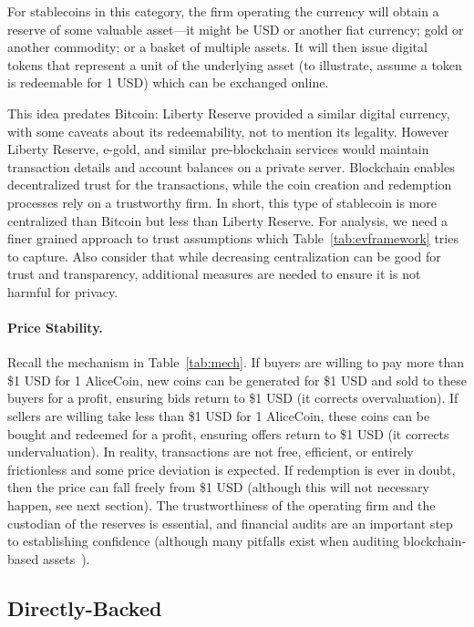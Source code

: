 For stablecoins in this category, the firm operating the currency will obtain a reserve of some valuable asset---it might be USD or another fiat currency; gold or another commodity; or a basket of multiple assets.  It will then issue digital tokens that represent a unit of the underlying asset (to illustrate, assume a token is redeemable for 1 USD) which can be exchanged online.

This idea predates Bitcoin: Liberty Reserve provided a similar digital currency, with some caveats about its redeemability, not to mention its legality. However Liberty Reserve, e-gold, and similar pre-blockchain services would maintain transaction details and account balances on a private server. Blockchain enables decentralized trust for the transactions, while the coin creation and redemption processes rely on a trustworthy firm. In short, this type of stablecoin is more centralized than Bitcoin but less than Liberty Reserve. For analysis, we need a finer grained approach to trust assumptions which Table~\ref{tab:evframework} tries to capture. Also consider that while decreasing centralization can be good for trust and transparency, additional measures are needed to ensure it is not harmful for privacy.

\paragraph{Price Stability.} Recall the mechanism in Table~\ref{tab:mech}. If buyers are willing to pay more than \$1 USD for 1 AliceCoin, new coins can be generated for \$1 USD and sold to these buyers for a profit, ensuring bids return to \$1 USD (it corrects overvaluation). If sellers are willing take less than \$1 USD for 1 AliceCoin, these coins can be bought and redeemed for a profit, ensuring offers return to \$1 USD (it corrects undervaluation). In reality, transactions are not free, efficient, or entirely frictionless and some price deviation is expected. If redemption is ever in doubt, then the price can fall freely from \$1 USD (although this will not necessary happen, see next section). The trustworthiness of the operating firm and the custodian of the reserves is essential, and financial audits are an important step to establishing confidence (although many pitfalls exist when auditing blockchain-based assets~\cite{PBEC19}). 


\subsection{Directly-Backed}
\label{sec:tether}

